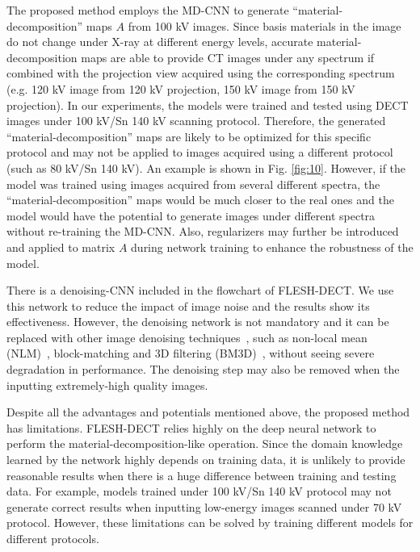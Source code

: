 \documentclass[journal,twoside,web]{ieeecolor}
\begin{document}
The proposed method employs the MD-CNN to generate “material-decomposition” maps $A$ from 100 kV images. Since basis materials in the image do not change under X-ray at different energy levels, accurate material-decomposition maps are able to provide CT images under any spectrum if combined with the projection view acquired using the corresponding spectrum (e.g. 120 kV image from 120 kV projection, 150 kV image from 150 kV projection). In our experiments, the models were trained and tested using DECT images under 100 kV/Sn 140 kV scanning protocol. Therefore, the generated “material-decomposition” maps are likely to be optimized for this specific protocol and may not be applied to images acquired using a different protocol (such as 80 kV/Sn 140 kV). An example is shown in Fig. \ref{fig:10}. However, if the model was trained using images acquired from several different spectra, the “material-decomposition” maps would be much closer to the real ones and the model would have the potential to generate images under different spectra without re-training the MD-CNN. Also, regularizers may further be introduced and applied to matrix $A$ during network training to enhance the robustness of the model.

There is a denoising-CNN included in the flowchart of FLESH-DECT. We use this network to reduce the impact of image noise and the results show its effectiveness. However, the denoising network is not mandatory and it can be replaced with other image denoising techniques~\cite{ma2011low}, such as non-local mean (NLM)~\cite{zhang2013iterative}, block-matching and 3D filtering (BM3D)~\cite{salehjahromi2017spectral}, without seeing severe degradation in performance. The denoising step may also be removed when the inputting extremely-high quality images.

Despite all the advantages and potentials mentioned above, the proposed method has limitations. FLESH-DECT relies highly on the deep neural network to perform the material-decomposition-like operation. Since the domain knowledge learned by the network highly depends on training data, it is unlikely to provide reasonable results when there is a huge difference between training and testing data. For example, %
models trained under 100 kV/Sn 140 kV protocol may not generate correct results when inputting low-energy images scanned under 70 kV protocol. However, these limitations can be solved by training different models for different protocols.
\end{document}
